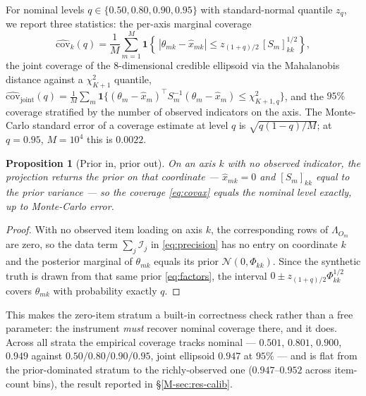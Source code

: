 \documentclass[11pt]{article}
\newcommand{\info}{\mathcal{I}}
\theoremstyle{plain}
\newtheorem{proposition}{Proposition}
\theoremstyle{definition}
\newcommand{\MSec}[1]{\S\ref{M-#1}}
\begin{document}
For nominal levels $q\in\{0.50,0.80,0.90,0.95\}$ with standard-normal quantile $z_q$, we
report three statistics: the per-axis marginal coverage
\begin{equation}
  \widehat{\mathrm{cov}}_k(q)=\frac{1}{M}\sum_{m=1}^{M}
  \mathbf 1\!\left\{\,|\theta_{mk}-\hat x_{mk}|\le z_{(1+q)/2}\,[S_m]_{kk}^{1/2}\right\},
  \label{eq:covax}
\end{equation}
the joint coverage of the $8$-dimensional credible ellipsoid via the Mahalanobis distance
against a $\chi^2_{K+1}$ quantile,
$\widehat{\mathrm{cov}}_{\mathrm{joint}}(q)=\tfrac1M\sum_m\mathbf 1\{(\theta_m-\hat x_m)^\top
S_m^{-1}(\theta_m-\hat x_m)\le \chi^2_{K+1,q}\}$, and the $95\%$ coverage stratified by the
number of observed indicators on the axis. The Monte-Carlo standard error of a coverage
estimate at level $q$ is $\sqrt{q(1-q)/M}$; at $q=0.95$, $M=10^4$ this is $0.0022$.

\begin{proposition}[Prior in, prior out]\label{prop:priorout}
On an axis $k$ with no observed indicator, the projection returns the prior on that
coordinate --- $\hat x_{mk}=0$ and $[S_m]_{kk}$ equal to the prior variance --- so the coverage
\eqref{eq:covax} equals the nominal level exactly, up to Monte-Carlo error.
\end{proposition}
\begin{proof}
With no observed item loading on axis $k$, the corresponding rows of $\Lambda_{O_m}$ are zero,
so the data term $\sum_j\info_j$ in \eqref{eq:precision} has no entry on coordinate $k$ and the
posterior marginal of $\theta_{mk}$ equals its prior $\mathcal N(0,\Phi_{kk})$. Since the
synthetic truth is drawn from that same prior \eqref{eq:factors}, the interval
$0\pm z_{(1+q)/2}\Phi_{kk}^{1/2}$ covers $\theta_{mk}$ with probability exactly $q$.
\end{proof}
\noindent
This makes the zero-item stratum a built-in correctness check rather than a free parameter:
the instrument \emph{must} recover nominal coverage there, and it does. Across all strata the
empirical coverage tracks nominal --- $0.501$, $0.801$, $0.900$, $0.949$ against
$0.50/0.80/0.90/0.95$, joint ellipsoid $0.947$ at $95\%$ --- and is flat from the
prior-dominated stratum to the richly-observed one ($0.947$–$0.952$ across item-count bins),
the result reported in \MSec{sec:res-calib}.
\end{document}
